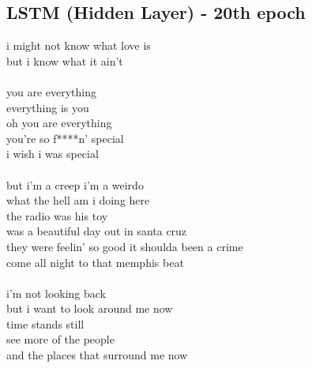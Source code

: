 \documentclass[conference]{IEEEtran}
\begin{document}
\subsection{LSTM (Hidden Layer) - 20th epoch}\label{HID20}
i might not know what love is \\
but i know what it ain't \\
\\
you are everything \\
everything is you \\
oh you are everything \\
you're so f****n' special \\
i wish i was special \\
\\
but i'm a creep i'm a weirdo \\
what the hell am i doing here \\
the radio was his toy \\
was a beautiful day out in santa cruz \\
they were feelin' so good it shoulda been a crime \\
come all night to that memphis beat \\
\\
i'm not looking back \\
but i want to look around me now \\
time stands still \\
see more of the people \\
and the places that surround me now \\
\end{document}
